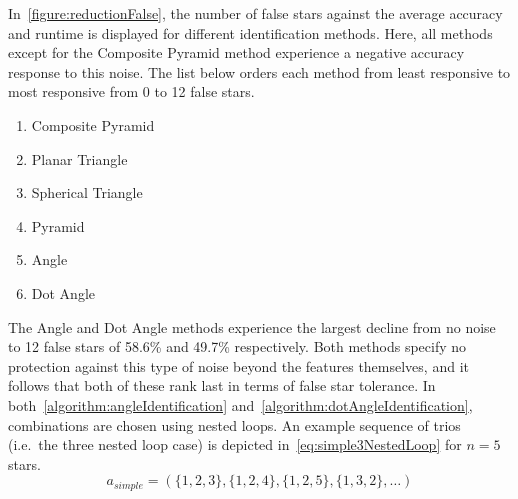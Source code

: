 \begin{figure}
\end{figure}

In~\autoref{figure:reductionFalse}, the number of false stars against the average accuracy and runtime is displayed
for different identification methods.
Here, all methods except for the Composite Pyramid method experience a negative accuracy response to this noise.
The list below orders each method from least responsive to most responsive from 0 to 12 false stars.
\begin{multicols}{2}
    \begin{enumerate}
        \item Composite Pyramid
        \item Planar Triangle
        \item Spherical Triangle
        \item Pyramid
        \item Angle
        \item Dot Angle
    \end{enumerate}
\end{multicols}

The Angle and Dot Angle methods experience the largest decline from no noise to 12 false stars of 58.6\% and 49.7\%
respectively.
Both methods specify no protection against this type of noise beyond the features themselves, and it follows that
both of these rank last in terms of false star tolerance.
In both~\autoref{algorithm:angleIdentification} and~\autoref{algorithm:dotAngleIdentification}, combinations are chosen
using nested loops.
An example sequence of trios (i.e.\ the three nested loop case) is depicted in~\autoref{eq:simple3NestedLoop} for
$n = 5$ stars.
\begin{equation}\label{eq:simple3NestedLoop}
a_{simple} = ( \{1,2,3\}, \{1,2,4\}, \{1,2,5\}, \{1,3,2\}, \ldots )
\end{equation}

